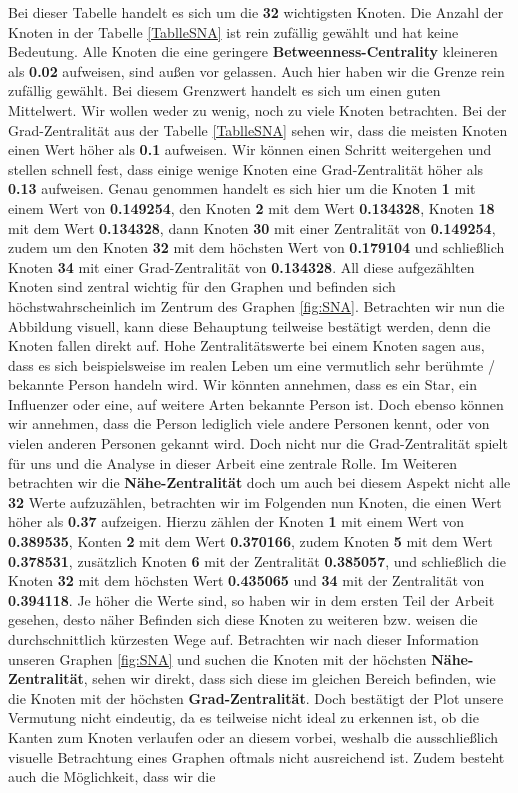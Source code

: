 \newpage
Bei dieser Tabelle handelt es sich um die \textbf{32} wichtigsten Knoten. Die Anzahl der Knoten in der Tabelle \ref{TablleSNA} ist rein zufällig gewählt und hat keine Bedeutung. Alle Knoten die eine geringere \textbf{Betweenness-Centrality} kleineren als \textbf{0.02} aufweisen, sind außen vor gelassen. Auch hier haben wir die Grenze rein zufällig gewählt. Bei diesem Grenzwert handelt es sich um einen guten Mittelwert. Wir wollen weder zu wenig, noch zu viele Knoten betrachten.
Bei der Grad-Zentralität aus der Tabelle \ref{TablleSNA} sehen wir, dass die meisten Knoten einen Wert höher als \textbf{0.1} aufweisen. Wir können einen Schritt weitergehen und stellen schnell fest, dass einige wenige Knoten eine Grad-Zentralität höher als \textbf{0.13} aufweisen. Genau genommen handelt es sich hier um die Knoten \textbf{1} mit einem Wert von \textbf{0.149254}, den Knoten \textbf{2} mit dem Wert \textbf{0.134328}, Knoten \textbf{18} mit dem Wert \textbf{0.134328}, dann Knoten \textbf{30} mit einer Zentralität von \textbf{0.149254}, zudem um den Knoten \textbf{32} mit dem höchsten Wert von \textbf{0.179104} und schließlich Knoten \textbf{34} mit einer Grad-Zentralität von \textbf{0.134328}. All diese aufgezählten Knoten sind zentral wichtig für den Graphen und befinden sich höchstwahrscheinlich im Zentrum des Graphen \ref{fig:SNA}. Betrachten wir nun die Abbildung visuell, kann diese Behauptung teilweise bestätigt werden, denn die Knoten fallen direkt auf. Hohe Zentralitätswerte bei einem Knoten sagen aus, dass es sich beispielsweise im realen Leben um eine vermutlich sehr berühmte / bekannte Person handeln wird. Wir könnten annehmen, dass es ein Star, ein Influenzer oder eine, auf weitere Arten bekannte Person ist. Doch ebenso können wir annehmen, dass die Person lediglich viele andere Personen kennt, oder von vielen anderen Personen gekannt wird. Doch nicht nur die Grad-Zentralität spielt für uns und die Analyse in dieser Arbeit eine zentrale Rolle. Im Weiteren betrachten wir die \textbf{Nähe-Zentralität} doch um auch bei diesem Aspekt nicht alle \textbf{32} Werte aufzuzählen, betrachten wir im Folgenden nun Knoten, die einen Wert höher als \textbf{0.37} aufzeigen. Hierzu zählen der Knoten \textbf{1} mit einem Wert von \textbf{0.389535}, Konten \textbf{2} mit dem Wert \textbf{0.370166}, zudem Knoten \textbf{5} mit dem Wert \textbf{0.378531}, zusätzlich Knoten \textbf{6} mit der Zentralität \textbf{0.385057}, und schließlich die Knoten \textbf{32} mit dem höchsten Wert \textbf{0.435065} und \textbf{34} mit der Zentralität von \textbf{0.394118}. Je höher die Werte sind, so haben wir in dem ersten Teil der Arbeit gesehen, desto näher Befinden sich diese Knoten zu weiteren bzw. weisen die durchschnittlich kürzesten Wege auf. Betrachten wir nach dieser Information unseren Graphen \ref{fig:SNA} und suchen die Knoten mit der höchsten \textbf{Nähe-Zentralität}, sehen wir direkt, dass sich diese im gleichen Bereich befinden, wie die Knoten mit der höchsten \textbf{Grad-Zentralität}. Doch bestätigt der Plot unsere Vermutung nicht eindeutig, da es teilweise nicht ideal zu erkennen ist, ob die Kanten zum Knoten verlaufen oder an diesem vorbei, weshalb die ausschließlich visuelle Betrachtung eines Graphen oftmals nicht ausreichend ist. Zudem besteht auch die Möglichkeit, dass wir die 